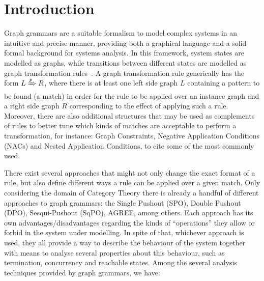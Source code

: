 \chapter{Introduction}

Graph grammars are a suitable formalism to model complex systems in an intuitive and precise manner, providing both a graphical language and a solid formal background for systems analysis. In this framework, system states are modelled as graphs, while transitions between different states are modelled as graph transformation rules~\cite{Ehrig2006}. A graph transformation rule generically has the form $L \xRightarrow{p} R$, where there is at least one left side graph $L$ containing a pattern to be found (a match) in order for the rule to be applied over an instance graph and a right side graph $R$ corresponding to the effect of applying such a rule. Moreover, there are also additional structures that may be used as complements of rules to better tune which kinds of matches are acceptable to perform a transformation, for instance: Graph Constraints, Negative Application Conditions (NACs) and Nested Application Conditions, to cite some of the most commonly used.

There exist several approaches that might not only change the exact format of a rule, but also define different ways a rule can be applied over a given match. Only considering the domain of Category Theory there is already a handful of different approaches to graph grammars: the Single Pushout (SPO), Double Pushout (DPO), Sesqui-Pushout (SqPO), AGREE, among others. Each approach has its own advantages/disadvantages regarding the kinds of  ``operations'' they allow or forbid in the system under modelling. 
In spite of that, whichever approach is used, they all provide a way to describe the behaviour of the system together with means to analyse several properties about this behaviour, such as termination, concurrency and reachable states. Among the several analysis techniques provided by graph grammars, we have:

